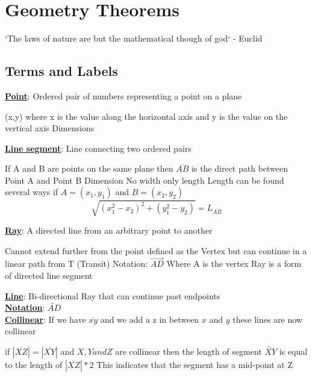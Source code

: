 \documentclass[12pt]{article}
\newcommand{\defline}[2]{\noindent\textbf{\underline{#1}}: #2\\}
\begin{document}
    \section {Geometry Theorems}
        `The laws of nature are but the mathematical though of god` - Euclid
        \subsection{Terms and Labels}

            \defline{Point}{Ordered pair of numbers representing a point on a plane}
            \begin{outline}
                \1 (x,y) where x is the value along the horizontal axis and y is the value on the vertical axis
                 Dimensions
            \end{outline}

            \defline{Line segment}{Line connecting two ordered pairs}
            \begin{outline}
                \1 If A and B are points on the same plane then $\overline{AB}$ is the direct path between Point A and Point B
                 Dimension
                \1 No width only length
                \1 Length can be found several ways
                    \2 if $A = (x_1, y_1)$ and $B = (x_2, y_2)$
                    \begin{equation}
                        \sqrt{(x_1^2 - x_2)^2 + (y_1^2 - y_2)} = L_{\overline{AB}}
                    \end{equation}
            \end{outline}

            \defline{Ray}{A directed line from an arbitrary point to another}
            \begin{outline}
                \1 Cannot extend further from the point defined as the Vertex but can continue in a linear path from T (Transit)
                \1 Notation: $\overrightarrow{AD}$ Where A is the vertex
                \1 Ray is a form of directed line segment
            \end{outline}

            \defline{Line}{Bi-directional Ray that can continue past endpoints}
            \defline{Notation}{$\overleftrightarrow{AD}$}

            \defline{Collinear}{If we have $\overline{xy}$ and we add a z in between $x$ and $y$ these lines are now collinear}
            \begin{outline}
                \1 if $|\overline{XZ}| = |\overline{XY}|$ and $X, Y and Z$ are collinear then the
                length of segment $\overleftrightarrow{XY}$ is equal to the length of $|\overline{XZ}| * 2$
                \1 This indicates that the segment has a mid-point at Z
            \end{outline}
\end{document}
